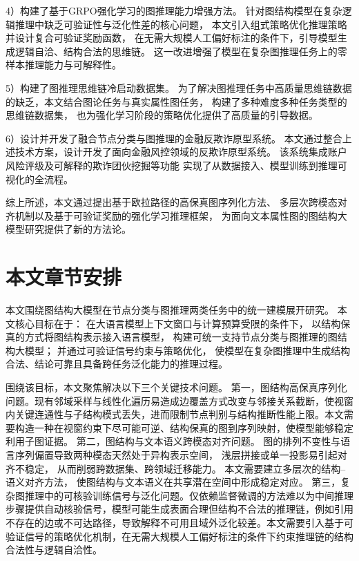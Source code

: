 4）构建了基于GRPO强化学习的图推理能力增强方法。 
针对图结构模型在复杂逻辑推理中缺乏可验证性与泛化性差的核心问题，
本文引入组式策略优化推理策略并设计复合可验证奖励函数，
在无需大规模人工偏好标注的条件下，引导模型生成逻辑自洽、结构合法的思维链。
这一改进增强了模型在复杂图推理任务上的零样本推理能力与可解释性。

5）构建了图推理思维链冷启动数据集。 
为了解决图推理任务中高质量思维链数据的缺乏，本文结合图论任务与真实属性图任务，
构建了多种难度多种任务类型的思维链数据集，
也为强化学习阶段的策略优化提供了高质量的引导数据。

6）设计并开发了融合节点分类与图推理的金融反欺诈原型系统。 
本文通过整合上述技术方案，设计开发了面向金融风控领域的反欺诈原型系统。
该系统集成账户风险评级及可解释的欺诈团伙挖掘等功能
实现了从数据接入、模型训练到推理可视化的全流程。

综上所述，本文通过提出基于欧拉路径的高保真图序列化方法、
多层次跨模态对齐机制以及基于可验证奖励的强化学习推理框架，
为面向文本属性图的图结构大模型研究提供了新的方法论。



\section{本文章节安排}

本文围绕图结构大模型在节点分类与图推理两类任务中的统一建模展开研究。
本文核心目标在于：
在大语言模型上下文窗口与计算预算受限的条件下，
以结构保真的方式将图结构表示接入语言模型，
构建可统一支持节点分类与图推理的图结构大模型；
并通过可验证信号约束与策略优化，
使模型在复杂图推理中生成结构合法、结论可靠且具备跨任务泛化能力的推理过程。

围绕该目标，本文聚焦解决以下三个关键技术问题。
第一，图结构高保真序列化问题。现有邻域采样与线性化遍历易造成边覆盖方式改变与邻接关系截断，使视窗内关键连通性与子结构模式丢失，进而限制节点判别与结构推断性能上限。本文需要构造一种在视窗约束下尽可能可逆、结构保真的图到序列映射，使模型能够稳定利用子图证据。
第二，图结构与文本语义跨模态对齐问题。
图的排列不变性与语言序列偏置导致两种模态天然处于异构表示空间，
浅层拼接或单一投影易引起对齐不稳定，
从而削弱跨数据集、跨领域迁移能力。
本文需要建立多层次的结构--语义对齐方法，
使图结构与文本语义在共享潜在空间中形成稳定对应。
第三，复杂图推理中的可核验训练信号与泛化问题。仅依赖监督微调的方法难以为中间推理步骤提供自动核验信号，模型可能生成表面合理但结构不合法的推理链，例如引用不存在的边或不可达路径，导致解释不可用且域外泛化较差。本文需要引入基于可验证信号的策略优化机制，在无需大规模人工偏好标注的条件下约束推理链的结构合法性与逻辑自洽性。

